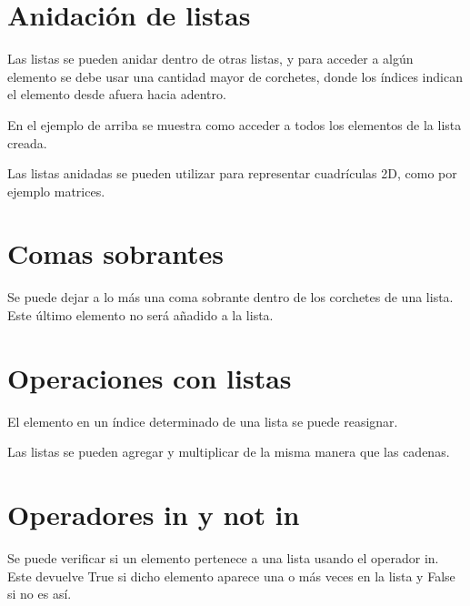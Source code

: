 \documentclass{report}
\begin{document}
{

\section{Anidación de listas}

Las listas se pueden anidar dentro de otras listas, y para acceder a algún elemento se debe usar una cantidad mayor de corchetes, donde los índices indican el elemento desde afuera hacia adentro.


En el ejemplo de arriba se muestra como acceder a todos los elementos de la lista creada.

Las listas anidadas se pueden utilizar para representar cuadrículas 2D, como por ejemplo matrices.


\section{Comas sobrantes}

Se puede dejar a lo más una coma sobrante dentro de los corchetes de una lista. Este último elemento no será añadido a la lista.


\section{Operaciones con listas}

El elemento en un índice determinado de una lista se puede reasignar.


Las listas se pueden agregar y multiplicar de la misma manera que las cadenas.


\section{Operadores in y not in}

Se puede verificar si un elemento pertenece a una lista usando el operador in. Este devuelve True si dicho elemento aparece una o más veces en la lista y False si no es así.


}
\end{document}
